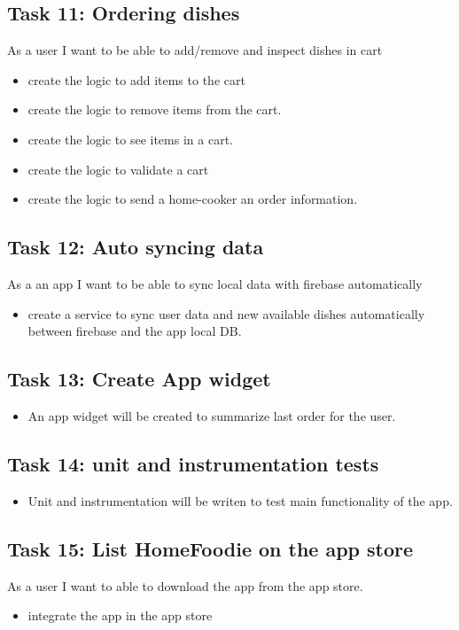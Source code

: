 \documentclass{article}
\begin{document}
\subsection{Task 11: Ordering dishes}
	As a user I want to be able to add/remove and inspect dishes in cart
  \begin{itemize}
    \item  create the logic to add items to the cart
    \item create the logic to remove items from the cart.
    \item create the logic to see items in a cart.
    \item create the logic to validate a cart
    \item create the logic to send a home-cooker an order information.
  \end{itemize}

\subsection{Task 12: Auto syncing data}
As a an app I want to be able to sync local data with firebase automatically 
  \begin{itemize}
    \item create a service to sync user data and new available dishes automatically between firebase and the app local DB.
  \end{itemize}

\subsection{Task 13: Create App widget}
  \begin{itemize}
    \item An app widget will be created to summarize last order for the user.
  \end{itemize}

\subsection{Task 14: unit and instrumentation tests}
  \begin{itemize} 
    \item Unit and instrumentation will be writen to test main functionality of the app.
  \end{itemize}


\subsection{Task 15: List HomeFoodie on the app store}
	As a user I want to able to download the app from the app store.
  \begin{itemize}
    \item	integrate the app in the app store
  \end{itemize}
\end{document}
